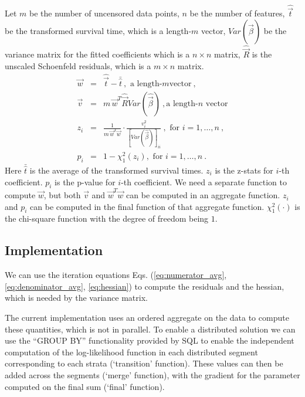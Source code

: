 Let $m$ be the number of uncensored data points, $n$ be the number of
features, $\hat{\vec{t}}$ be the transformed survival time, which is a
length-$m$ vector,
$\mathit{Var}(\hat{\vec{\beta}})$ be the variance matrix for the
fitted coefficients which is a $n\times n$ matrix, $\hat{\vec{R}}$
is the unscaled Schoenfeld residuals, which is a $m\times n$ matrix.
\begin{eqnarray}
\vec{w} &=& \hat{\vec{t}} - \bar{\hat{t}}\ , \mbox{ a length-}m \mbox{
  vector}\ ,\\
\vec{v} &=& m\,\vec{w}^T\hat{\vec{R}}\mathit{Var}(\hat{\vec{\beta}})\ , \mbox{
a length-}n\mbox{ vector}\\
z_i &=& \frac{1}{m\,\vec{w}^T\vec{w}}
\cdot\frac{v^2_i}{\left[\mathit{Var}(\hat{\vec{\beta}})\right]_{ii}}\
, \mbox{ for }i=1,\dots,n\ ,\\
p_i &=& 1 - \chi_1^2(z_i), \mbox{ for }i=1,\dots,n\ .
\end{eqnarray}
Here $\bar{\hat{t}}$ is the average of the transformed survival
times. $z_i$ is the z-stats for $i$-th coefficient. $p_i$ is the
p-value for $i$-th coefficient. We need a separate function to compute
$\vec{w}$, but both $\vec{v}$ and $\vec{w}^T\vec{w}$ can be computed
in an aggregate function. $z_i$ and $p_i$ can be computed in the final
function of that aggregate function. $\chi^2_1(\cdot)$ is the
chi-square function with the degree of freedom being $1$.

\subsection{Implementation}
We can use the iteration equations Eqs. (\ref{eq:numerator_avg},
 \ref{eq:denominator_avg}, \ref{eq:hessian}) to compute the residuals and the
hessian, which is needed by the variance matrix.

The current implementation uses an ordered aggregate on the data to
compute these quantities, which is not in parallel. To enable a distributed
solution we can use the ``GROUP BY'' functionality provided by SQL to enable the
independent computation of the log-likelihood function in each distributed segment
corresponding to each strata (`transition' function). These values can then be added
across the segments (`merge' function), with the gradient for the parameter computed
on the final sum (`final' function).
